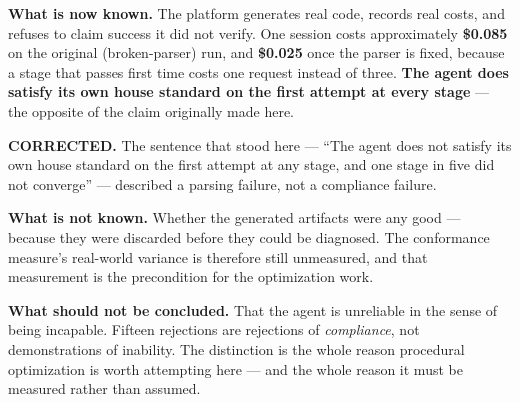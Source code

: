 \documentclass[11pt,a4paper]{article}
\begin{document}
\textbf{What is now known.} The platform generates real code, records real costs,
and refuses to claim success it did not verify. One session costs approximately
\textbf{\$0.085} on the original (broken-parser) run, and \textbf{\$0.025} once the
parser is fixed, because a stage that passes first time costs one request instead of
three. \textbf{The agent does satisfy its own house standard on the first attempt at
every stage} --- the opposite of the claim originally made here.

\begin{notebox}[colframe=warn]
\textbf{CORRECTED.} The sentence that stood here --- ``The agent does not satisfy its
own house standard on the first attempt at any stage, and one stage in five did not
converge'' --- described a parsing failure, not a compliance failure.
\end{notebox}

\textbf{What is not known.} Whether the generated artifacts were any good ---
because they were discarded before they could be diagnosed. The conformance
measure's real-world variance is therefore still unmeasured, and that measurement
is the precondition for the optimization work.

\textbf{What should not be concluded.} That the agent is unreliable in the sense of
being incapable. Fifteen rejections are rejections of \emph{compliance}, not
demonstrations of inability. The distinction is the whole reason procedural
optimization is worth attempting here --- and the whole reason it must be measured
rather than assumed.
\end{document}
